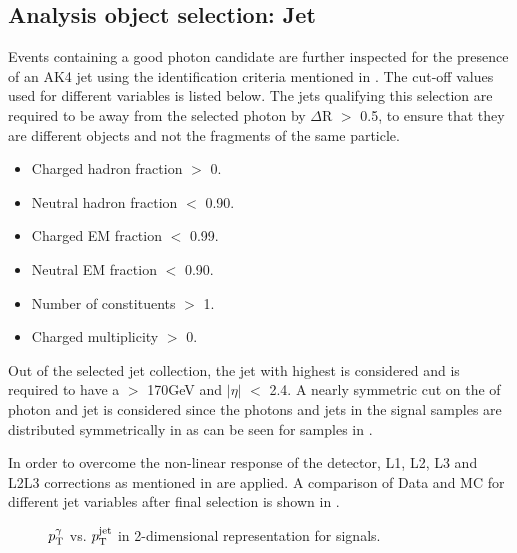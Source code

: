 \subsection{Analysis object selection: Jet}
Events containing a good photon candidate are further inspected for the presence of an AK4 jet using the identification criteria mentioned in \sectn{\ref{Se:JetID}}.
The cut-off values used for different variables is listed below. The jets qualifying this selection are required to be away from the selected photon
by $\Delta$R $>$ 0.5, to ensure that they are different objects and not the fragments of the same particle.
\vspace{-0.1in}
\begin{itemize}[leftmargin=*]
\item Charged hadron fraction $>$ 0.
\item Neutral hadron fraction $<$ 0.90.
\item Charged EM fraction $<$ 0.99.
\item Neutral EM fraction $<$ 0.90.
\item Number of constituents $>$ 1.
\item Charged multiplicity $>$ 0.
\end{itemize}

Out of the selected jet collection, the jet with highest \pt is considered and is required to have a \pt $>$ 170\unit{GeV} and $|\eta|$ $<$ 2.4.
A nearly symmetric cut on the \pt of photon and jet is considered since the photons and jets in the signal samples are distributed symmetrically in \pt as can be seen for
\qstar samples in \fig{\ref{fig:qstar_ptcomp}}. 

In order to overcome the non-linear response of the detector, L1, L2, L3 and L2L3 corrections as mentioned in \sectn{\ref{Se:JetEnCorr}} are applied.
A comparison of Data and MC for different jet variables after final selection is shown in \fig{\ref{fig:JetId}}.

\begin{figure}[h]
\centering
  \hspace{0.2in}
\caption{$p_{\mathrm T}^{\gamma}$ vs. $p_{\mathrm T}^{\textrm{jet}}$ in 2-dimensional representation for \qstar signals.}
\label{fig:qstar_ptcomp}
\end{figure}

